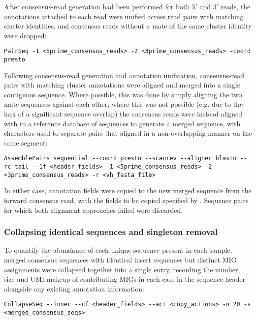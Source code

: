 After consensus-read generation had been performed for both 5' and 3' reads, the annotations attached to each read were unified across read pairs with matching cluster identities, and consensus reads without a mate of the same cluster identity were dropped:

\begin{lstlisting}
PairSeq -1 <5prime_consensus_reads> -2 <3prime_consensus_reads> -coord presto
\end{lstlisting}

Following consensus-read generation and annotation unification, consensus-read pairs with matching cluster annotations were aligned and merged into a single contiguous sequence. Where possible, this was done by simply aligning the two mate sequences against each other; where this was not possible (e.g. due to the lack of a significant sequence overlap) the consensus reads were instead aligned with  \parencite{altschul1990blast,altschul1997blast} to a reference database of \vh sequences to generate a merged sequence, with  characters used to separate pairs that aligned in a non-overlapping manner on the same \vh segment:

\begin{lstlisting}
AssemblePairs sequential --coord presto --scanrev --aligner blastn --rc tail --1f <header_fields> -1 <5prime_consensus_reads> -2 <3prime_consensus_reads> -r <vh_fasta_file>
\end{lstlisting}

In either case, annotation fields were copied to the new merged sequence from the forward consensus read, with the fields to be copied specified by . Sequence pairs for which both alignment approaches failed were discarded.

\subsubsection{Collapsing identical sequences and singleton removal}
\label{sec:methods_comp_igpreproc_collapse}

To quantify the abundance of each unique sequence present in each sample, merged consensus sequences with identical insert sequences but distinct MIG assignments were collapsed together into a single  entry, recording the number, size and UMI makeup of contributing MIGs in each case in the sequence header alongside any existing annotation information:

\begin{lstlisting}
CollapseSeq --inner --cf <header_fields> --act <copy_actions> -n 20 -s <merged_consensus_seqs>
\end{lstlisting}


